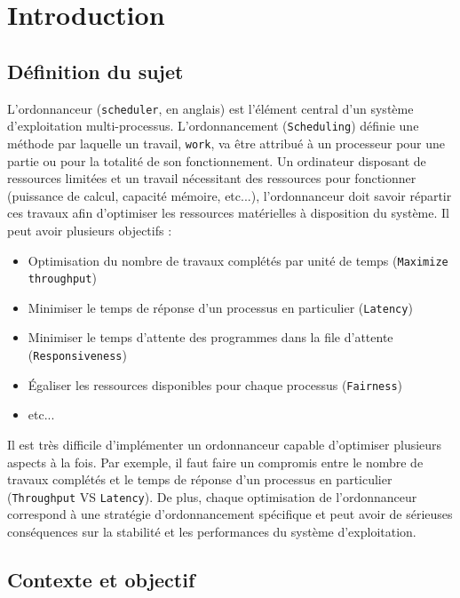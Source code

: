 \chapter{Introduction}
    \section{Définition du sujet}
    
    L'ordonnanceur (\texttt{scheduler}, en anglais) est l'élément central d'un système d'exploitation multi-processus. L'ordonnancement (\texttt{Scheduling}) définie une méthode par laquelle un travail, \texttt{work}, va être attribué à un processeur pour une partie ou pour la totalité de son fonctionnement. Un ordinateur disposant de ressources limitées et un travail nécessitant des ressources pour fonctionner (puissance de calcul, capacité mémoire, etc...), l'ordonnanceur doit savoir répartir ces travaux afin d'optimiser les ressources matérielles à disposition du système. Il peut avoir plusieurs objectifs : 
    
    \begin{itemize}
        \item Optimisation du nombre de travaux complétés par unité de temps (\texttt{Maximize throughput})
        \item Minimiser le temps de réponse d'un processus en particulier (\texttt{Latency})
        \item Minimiser le temps d'attente des programmes dans la file d'attente (\texttt{Responsiveness})
        \item Égaliser les ressources disponibles pour chaque processus (\texttt{Fairness})
        \item etc...
    \end{itemize}
    
    Il est très difficile d'implémenter un ordonnanceur capable d'optimiser plusieurs aspects à la fois. Par exemple, il faut faire un compromis entre le nombre de travaux complétés et le temps de réponse d'un processus en particulier (\texttt{Throughput} VS \texttt{Latency}). De plus, chaque optimisation de l'ordonnanceur correspond à une stratégie d'ordonnancement spécifique et peut avoir de sérieuses conséquences sur la stabilité et les performances du système d'exploitation.
    
    \section{Contexte et objectif}
        
